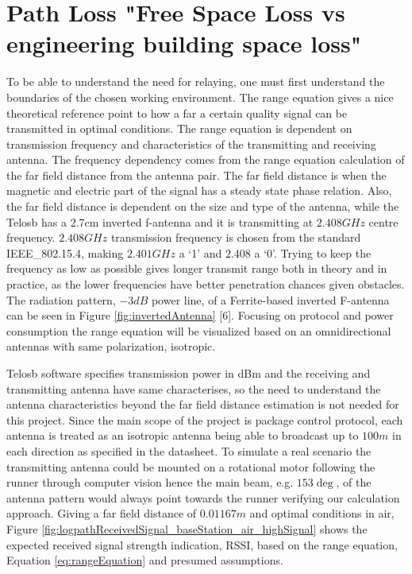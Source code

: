\section{Path Loss "Free Space Loss vs engineering building space loss"}\label{sc:pathLoss}

To be able to understand the need for relaying, one must first understand the boundaries of the chosen working environment. The range equation gives a nice theoretical reference point to how a far a certain quality signal can be transmitted in optimal conditions. The range equation is dependent on transmission frequency and characteristics of the transmitting and receiving antenna. The frequency dependency comes from the range equation calculation of the far field distance from the antenna pair. The far field distance is when the magnetic and electric part of the signal has a steady state phase relation. Also, the far field distance is dependent on the size and type of the antenna, while the Telosb has a 2.7cm inverted f-antenna and it is transmitting at $2.408GHz$ centre frequency. $2.408GHz$ transmission frequency is chosen from the standard IEEE\_802.15.4, making $2.401GHz$ a ‘1’ and $2.408$ a ‘0’. Trying to keep the frequency as low as possible gives longer transmit range both in theory and in practice, as the lower frequencies have better penetration chances given obstacles. The radiation pattern, $-3dB$ power line, of a Ferrite-based inverted F-antenna can be seen in Figure \ref{fig:invertedAntenna} [6]. Focusing on protocol and power consumption the range equation will be visualized based on an omnidirectional antennas with same polarization, isotropic.


Telosb software specifies transmission power in dBm and the receiving and transmitting antenna have same characterises, so the need to understand the antenna characteristics beyond the far field distance estimation is not needed for this project. Since the main scope of the project is package control protocol, each antenna is treated as an isotropic antenna being able to broadcast up to $100m$ in each direction as specified in the datasheet. To simulate a real scenario the transmitting antenna could be mounted on a rotational motor following the runner through computer vision hence the main beam, e.g. $153\deg$, of the antenna pattern would always point towards the runner verifying our calculation approach. Giving a far field distance of $0.01167m$ and optimal conditions in air, Figure \ref{fig:logpathReceivedSignal_baseStation_air_highSignal} shows the expected received signal strength indication, RSSI, based on the range equation, Equation \ref{eq:rangeEquation} and presumed assumptions.

